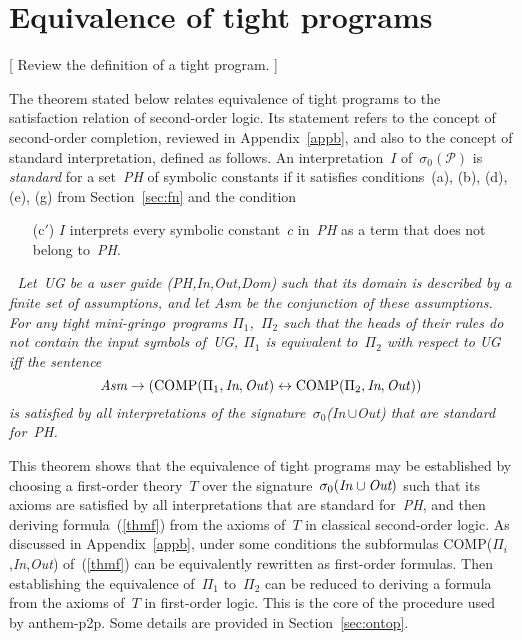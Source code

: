 \documentclass{new_tlp}
\def\lrar{\leftrightarrow}
\def\beq{\begin{equation}}
\def\eeq#1{\label{#1}\end{equation}}
\def\gringo{{\sc gringo}}
\newcommand{\PP}{\mathcal{P}}
\begin{document}
\section{Equivalence of tight programs}\label{sec:tight}

[ Review the definition of a tight program. ]
\bigskip

The theorem stated below relates equivalence of tight programs to the
satisfaction relation of second-order logic.  Its statement refers to
the concept of second-order completion, reviewed in Appendix~\ref{appb},
and also to the concept of  standard interpretation, defined as follows.
An interpretation~$I$ of~$\sigma_0(\PP)$ is \emph{standard} for a
set~\emph{PH} of symbolic constants if it
satisfies conditions~(a), (b), (d), (e), (g)
from Section~\ref{sec:fn} and the condition
\begin{itemize}
\item[(c$'$)] $I$ interprets every symbolic constant~$c$ in~\emph{PH}
  as a term that does not belong to~\emph{PH}.
\end{itemize}

\medskip{}$\;$\emph{
  Let~UG be a user guide (PH,In,Out,Dom) such that its domain is described by
  a finite set of assumptions, and let Asm be the conjunction of these
  assumptions.
  For any tight mini-\gringo\ programs $\Pi_1$,~$\Pi_2$ such that the
  heads of their rules do not contain the input symbols of~UG,
$\Pi_1$ is equivalent to~$\Pi_2$ with respect to UG iff the sentence}
\beq
\emph{Asm}\to(\hbox{COMP}(\Pi_1,\emph{In},\emph{Out\/}) \lrar
\hbox{COMP}(\Pi_2,\emph{In},\emph{Out\/}))
\eeq{thmf}
\emph{is satisfied by all interpretations of the
  signature~$\sigma_0$(In\,$\cup$Out) that are standard for~PH.}
\medskip

This theorem shows that the equivalence of tight programs may be established
by choosing a first-order theory~$T$ over the
signature~$\sigma_0(\emph{In\/}\cup\emph{Out})$ such that its axioms are
satisfied by all interpretations that are
standard for~\emph{PH}, and then deriving
formula~(\ref{thmf}) from the axioms of~$T$ in classical second-order logic.
As discussed in Appendix~\ref{appb}, under some conditions the
subformulas COMP($\Pi_i$,\emph{In\/},\emph{Out\/}) of~(\ref{thmf}) can be
equivalently rewritten as first-order formulas.  Then
establishing the equivalence of~$\Pi_1$ to~$\Pi_2$ can be reduced to
deriving a formula from the axioms of~$T$ in first-order logic.
This is the core of the procedure used by {\sc anthem-p2p}.  Some
details are provided in Section~\ref{sec:ontop}.
\end{document}
